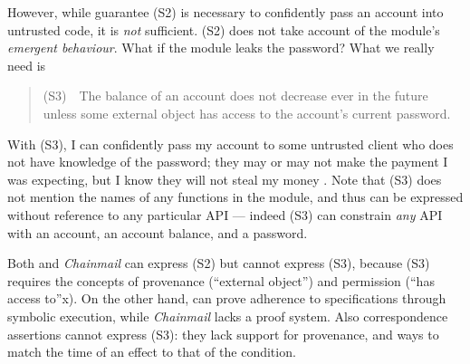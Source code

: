 \vspace{.04in}

However, while guarantee (S2) is necessary   to confidently pass 
 an account into untrusted code, it is \emph{not} sufficient.
 (S2) does not take  account of the module's \emph{emergent behaviour}.
 What if the module leaks the password?
 What we really need is
 \begin{quote}
(S3)\  \ The balance of an account does not decrease ever in the future unless some external 
object has access to the account's current password.
\end{quote}
With (S3), I can confidently pass my account to some untrusted client who
  does not have
 knowledge of the password; they may or may not make the payment I was expecting, but I
 know they will not steal my money \cite{ooToSecurity,miller-esop2013}.
 Note that (S3)  does not mention
 the names of any functions in the module, and 
 thus can be expressed without reference to any particular API ---
 indeed (S3) can constrain \emph{any} API with an account, an account
 balance, and a password.
 

  Both {} and  \emph{Chainmail} can express (S2) but
  {}  cannot express (S3), because 
(S3)  requires the concepts of provenance (``external object'') and
  permission (``has access to''x).
On the other hand, {} can prove adherence to  specifications through symbolic 
  execution, while  \emph{Chainmail}   lacks a proof system. 
   Also correspondence assertions cannot express (S3): they lack
    support for provenance, and ways to match the time of an effect to that of the
    condition.%
  
\vspace{.04in}

